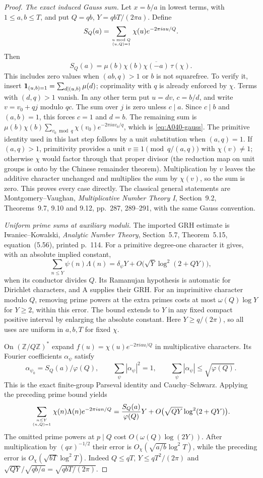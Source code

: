 \begin{proof}
\emph{The exact induced Gauss sum.}
Let $x=b/a$ in lowest terms, with $1\le a,b\le T$, and put
$Q=qb$, $Y=qbT/(2\pi a)$. Define
\[
 S_{Q}(a)=\sum_{u\bmod Q\atop(u,Q)=1}
                   \chi(u)e^{-2\pi iau/Q}.
\]
Then
\begin{equation}\label{eq:A040-gauss}
 S_Q(a)=\mu(b)\chi(b)\overline{\chi(-a)}\,\tau(\chi).
\end{equation}
This includes zero values when $(ab,q)>1$ or $b$ is not
squarefree. To verify it, insert
${\bf1}_{(u,b)=1}=\sum_{d\mid(u,b)}\mu(d)$; coprimality
with $q$ is already enforced by $\chi$. Terms with $(d,q)>1$
vanish. In any other term put $u=dv$, $c=b/d$, and write
$v=v_0+qj$ modulo $qc$. The sum over $j$ is zero unless
$c\mid a$. Since $c\mid b$ and $(a,b)=1$, this forces
$c=1$ and $d=b$. The remaining sum is
$\mu(b)\chi(b)\sum_{v_0\bmod q}\chi(v_0)e^{-2\pi ia v_0/q}$,
which is \eqref{eq:A040-gauss}.
The primitive identity used in this last step follows by a
unit substitution when $(a,q)=1$. If $(a,q)>1$, primitivity
provides a unit $v\equiv1\pmod{q/(a,q)}$ with $\chi(v)\ne1$;
otherwise $\chi$ would factor through that proper divisor
(the reduction map on unit groups is onto by the Chinese
remainder theorem). Multiplication by $v$ leaves the additive
character unchanged and multiplies the sum by $\chi(v)$, so
the sum is zero. This proves every case directly. The classical
general statements are Montgomery--Vaughan, \emph{Multiplicative
Number Theory I}, Section~9.2, Theorems~9.7, 9.10 and 9.12,
pp.~287, 289--291, with the same Gauss convention.

\emph{Uniform prime sums at auxiliary moduli.}
The imported GRH estimate is Iwaniec--Kowalski,
\emph{Analytic Number Theory}, Section~5.7, Theorem~5.15,
equation~(5.56), printed p.~114. For a primitive degree-one
character it gives, with an absolute implied constant,
\[
 \sum_{n\le Y}\psi(n)\Lambda(n)
       =\delta_\psi Y+O\bigl(\sqrt Y\log^2(2+QY)\bigr),
\]
when its conductor divides $Q$. Its Ramanujan hypothesis is
automatic for Dirichlet characters, and A supplies their GRH.
For an imprimitive character modulo $Q$, removing prime powers
at the extra primes costs at most $\omega(Q)\log Y$ for $Y\ge2$,
within this error. The bound extends to $Y$ in any fixed compact
positive interval by enlarging the absolute constant. Here
$Y\ge q/(2\pi)$, so all uses are uniform in $a,b,T$ for fixed
$\chi$.

On $(\mathbb Z/Q\mathbb Z)^*$ expand
$f(u)=\chi(u)e^{-2\pi iau/Q}$ in multiplicative characters.
Its Fourier coefficients $\alpha_\psi$ satisfy
\[
 \alpha_{\psi_0}=S_Q(a)/\varphi(Q),\qquad
 \sum_\psi|\alpha_\psi|^2=1,
                     \qquad\sum_\psi|\alpha_\psi|\le\sqrt{\varphi(Q)}.
\]
This is the exact finite-group Parseval identity and
Cauchy--Schwarz. Applying the preceding prime bound yields
\[
 \sum_{n\le Y\atop(n,Q)=1}
      \chi(n)\Lambda(n)e^{-2\pi ian/Q}
 =\frac{S_Q(a)}{\varphi(Q)}Y
           +O\bigl(\sqrt{QY}\log^2(2+QY)\bigr).
\]
The omitted prime powers at $p\mid Q$ cost
$O(\omega(Q)\log(2Y))$. After multiplication by
$(qx)^{-1/2}$ their error is
$O_\chi(\sqrt{a/b}\log^2T)$, while the preceding error is
$O_\chi(\sqrt{bT}\log^2T)$.
Indeed $Q\le qT$, $Y\le qT^2/(2\pi)$ and
$\sqrt{QY}/\sqrt{qb/a}=\sqrt{qbT/(2\pi)}$.


\end{proof}
